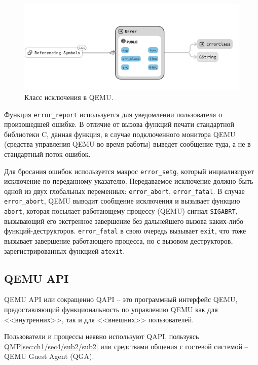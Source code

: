 \begin{figure}[!htbp]
    \centering
    \begin{adjustbox}{max totalsize={0.8\textwidth}{\textheight}}
        \includegraphics[]{images/qemu-error.png}
    \end{adjustbox}
    \caption{Класс исключения в QEMU.}\label{fig:qemu-error}
\end{figure}

Функция \texttt{error\_report} используется для уведомлении пользователя о
произошедшей ошибке. В отличие от вызова функций печати стандартной библиотеки C,
данная функция, в случае подключенного монитора QEMU (средства управления QEMU
во время работы) выведет сообщение туда, а не в стандартный поток ошибок.

Для бросания ошибок используется макрос \texttt{error\_setg}, который инциализирует
исключение по переданному указателю. Передаваемое исключение должно быть одной из
двух глобальных переменных: \texttt{error\_abort}, \texttt{error\_fatal}.
В случае \texttt{error\_abort}, QEMU выводит сообщение исключения и вызывает
функцию \texttt{abort}, которая посылает работающему процессу (QEMU) сигнал
\texttt{SIGABRT}, вызывающий его экстренное завершение без дальнейшего вызова каких-либо
функций-деструкторов.
\texttt{error\_fatal} в свою очередь вызывает \texttt{exit}, что тоже вызывает
завершение работающего процесса, но с вызовом деструкторов, зарегистрированных
функцией \texttt{atexit}.

\subsection{QEMU API}\label{sec:ch1/sec4/sub3/sub6}

QEMU API или сокращенно QAPI -- это программный интерфейс QEMU, предоставляющий функциональность по
управлению QEMU как для <<внутренних>>, так и для <<внешних>> пользователей.

Пользователи и процессы неявно используют QAPI, пользуясь QMP\cref{sec:ch1/sec4/sub2/sub2} или средствами
общения с гостевой системой -- QEMU Guest Agent (QGA).

